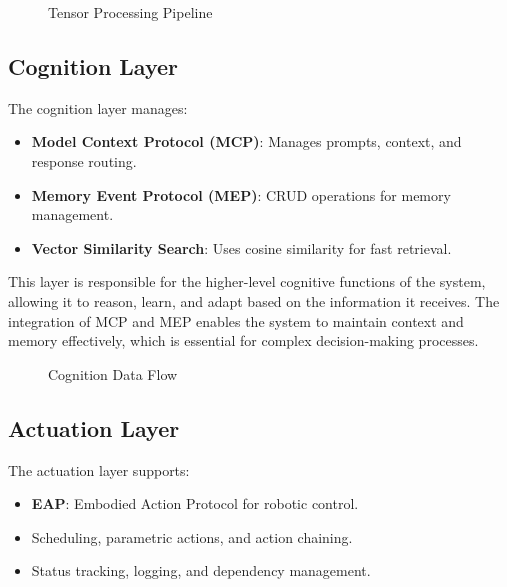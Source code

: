 \documentclass[12pt]{article}
\begin{document}
\begin{figure}[H]
\centering
{}
\caption{Tensor Processing Pipeline}
\end{figure}

\subsection{Cognition Layer}
The cognition layer manages:
\begin{itemize}
  \item \textbf{Model Context Protocol (MCP)}: Manages prompts, context, and response routing.
  \item \textbf{Memory Event Protocol (MEP)}: CRUD operations for memory management.
  \item \textbf{Vector Similarity Search}: Uses cosine similarity for fast retrieval.
\end{itemize}

This layer is responsible for the higher-level cognitive functions of the system, allowing it to reason, learn, and adapt based on the information it receives. The integration of MCP and MEP enables the system to maintain context and memory effectively, which is essential for complex decision-making processes.

\begin{figure}[H]
\centering
{}
\caption{Cognition Data Flow}
\end{figure}

\subsection{Actuation Layer}
The actuation layer supports:
\begin{itemize}
  \item \textbf{EAP}: Embodied Action Protocol for robotic control.
  \item Scheduling, parametric actions, and action chaining.
  \item Status tracking, logging, and dependency management.
\end{itemize}
\end{document}
